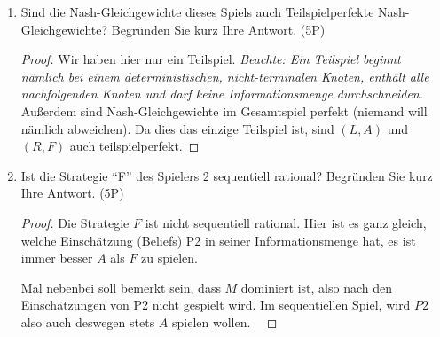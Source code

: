 \documentclass[12pt]{article}
\begin{document}
\begin{enumerate}[label=\alph*\upshape)]
\begin{proof}
			\textit{Hier bin ich mir nicht sicher, ob man nur in reinen Strategien untersuchen sollte.} Tipp: die Suche nach Nash-Gleichgewichten in gemischten Strategien für drei Strategien ist schwierig und dauert lang. Oft Mals kann man allerdings eine der drei Strategien vorab ausschließen. ~\smallskip
			
			Da $M$ strikt dominiert ist durch $R$, folgt analog wie in Aufgabe 1 c), dass $M$ in keinem Gleichgewicht vorkommen kann. Angenommen P1 spielt mit Wahrscheinlichkeit $p \in (0, 1)$ die Strategie $L$ und mit $(1-p)$ die Strategie $R$. Für ein Nash-Gleichgewicht müsste der erwartete Nutzen für P2 ausgeglichen sein, d.h.
			\begin{align*}
				\mathbb{E}[u(A)] & \overset{!}{=} \mathbb{E}[u(F)] \\
				\iff 1 \cdot p +  3 \cdot (1-p) & = 0 \cdot p + 3 \cdot (1-p) \iff p = 0,
			\end{align*}
			was einen Widerspruch darstellt. Es existiert also kein Nash-Gleichgewicht in (echt) gemischten Strategien und $(L,A)$ und $(R, F)$ sind damit die einzigen Gleichgewichte. ~\smallskip
			
			\textit{Auch hier gibt es wieder ein kurzes Argument: $A$ dominiert nämlich die Strategie $F$ schwach. Würde P1 eine echte Mischung auf $L$ und $R$ spielen, wird P2 stets $A$ wählen wollen, worauf $P1$ allerdings lieber rein $L$ spielt. Das heißt es kann kein Gleichgewicht in gemischten Strategien geben. Falls dies nicht ganz klar ist, einfach wie oben kurz per Hand nachrechnen.}
		\end{proof}
	\item Sind die Nash-Gleichgewichte dieses Spiels auch Teilspielperfekte Nash-Gleichgewichte? Begründen Sie kurz Ihre Antwort. (5P)
		\begin{proof}
			Wir haben hier nur ein Teilspiel. \textit{Beachte: Ein Teilspiel beginnt nämlich bei einem deterministischen, nicht-terminalen Knoten, enthält alle nachfolgenden Knoten und darf keine Informationsmenge durchschneiden.} Außerdem sind Nash-Gleichgewichte im Gesamtspiel perfekt (niemand will nämlich abweichen). Da dies das einzige Teilspiel ist, sind $(L,A)$ und $(R, F)$ auch teilspielperfekt. 
		\end{proof}
	\item Ist die Strategie \enquote{F} des Spielers 2 sequentiell rational? Begründen Sie kurz Ihre Antwort. (5P)
		\begin{proof}
			Die Strategie $F$ ist nicht sequentiell rational. Hier ist es ganz gleich, welche Einschätzung (Beliefs) P2 in seiner Informationsmenge hat, es ist immer besser $A$ als $F$ zu spielen. ~\smallskip
			
			Mal nebenbei soll bemerkt sein, dass $M$ dominiert ist, also nach den Einschätzungen von P2 nicht gespielt wird. Im sequentiellen Spiel, wird $P2$ also auch deswegen stets $A$ spielen wollen. ~\smallskip
		\end{proof}
\end{enumerate}
\end{document}
